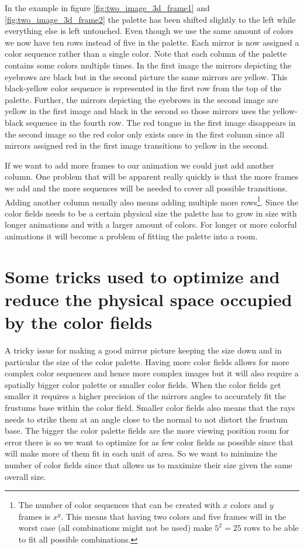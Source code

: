 \documentclass{article}
\begin{document}
In the example in figure \ref{fig:two_image_3d_frame1} and \ref{fig:two_image_3d_frame2} the palette has been shifted slightly to the left
while everything else is left untouched. Even though we use the same
amount of colors we now have ten rows instead of five in the palette.
Each mirror is now assigned a color sequence rather than a single
color. Note that each column of the palette contains some colors
multiple times. In the first image the mirrors depicting the eyebrows
are black but in the second picture the same mirrors are yellow. This
black-yellow color sequence is represented in the first row from the top
of the palette. Further, the mirrors depicting the eyebrows in the
second image are yellow in the first image and black in the second so
those mirrors uses the yellow-black sequence in the fourth row. The red
tongue in the first image disappears in the second image so the red
color only exists once in the first column since all mirrors assigned
red in the first image transitions to yellow in the second.

If we want to add more frames to our animation we could just add another
column. One problem that will be apparent really quickly is that the
more frames we add and the more sequences will be needed to cover all
possible transitions. Adding another column usually also means adding
multiple more rows\footnote{The number of color sequences that can be
  created with \(x\) colors and \(y\) frames is \(x^y\). This means
  that having two colors and five frames will in the worst case (all
  combinations might not be used) make \(5^2 = 25\) rows to be able to
  fit all possible combinations.}. Since the color fields needs to be a
certain physical size the palette has to grow in size with longer
animations and with a larger amount of colors. For longer or more
colorful animations it will become a problem of fitting the palette
into a room.

\section{Some tricks used to optimize and reduce the physical space occupied by the color fields}

A tricky issue for making a good mirror picture keeping the size
down and in particular the size of the color palette. Having more
color fields allows for more complex color sequences and hence more
complex images but it will also require a spatially bigger color
palette or smaller color fields. When the color fields get smaller it
requires a higher precision of the mirrors angles to accurately fit the
frustums base within the color field. Smaller color fields also means
that the rays needs to strike them at an angle close to the normal to
not distort the frustum base. The bigger the color palette fields are
the more viewing position room for error there is so we want to optimize
for as few color fields as possible since that will make more of them
fit in each unit of area. So we want to minimize the number of color
fields since that allows us to maximize their size given the same
overall size.
\end{document}
